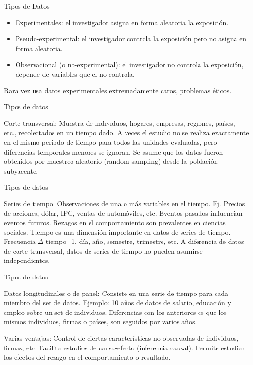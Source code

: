 \documentclass{beamer}
\begin{document}
    \begin{frame}{Tipos de Datos }
      

\begin{itemize}
    \item {\color{blue}Experimentales}: el investigador asigna en forma aleatoria la exposici\'on.
    \item {\color{blue} Pseudo-experimental}: el investigador controla la exposici\'on pero no
asigna en forma aleatoria.
\item {\color{blue}Observacional (o no-experimental)}: el investigador no controla la exposici\'on, depende de variables que el no controla.
\end{itemize}

{\color{blue} Rara vez usa datos experimentales
extremadamente caros, problemas éticos.}
    \end{frame}

    \begin{frame}{Tipos de datos}

   {\color{blue}Corte transversal: }Muestra de individuos, hogares, empresas, regiones, países, etc., recolectados en un tiempo dado.
A veces el estudio no se realiza exactamente en el mismo periodo de tiempo para todos las unidades evaluadas, pero diferencias temporales menores se ignoran.
Se asume que los datos fueron obtenidos por muestreo aleatorio (random sampling) desde la población subyacente.

        
    \end{frame}


\begin{frame}{Tipos de datos}

{\color{blue}Series de tiempo: }Observaciones de una o más variables en el tiempo.
Ej. Precios de acciones, dólar, IPC, ventas de automóviles, etc.
Eventos pasados influencian eventos futuros.
Rezagos en el comportamiento son prevalentes en ciencias sociales.
Tiempo es una dimensión importante en datos de series de tiempo.
Frecuencia $\Delta$ tiempo=1, día, año, semestre, trimestre, etc. 
A diferencia de datos de corte transversal, datos de series de tiempo no pueden asumirse independientes.

\end{frame}

\begin{frame}{Tipos de datos}

{\color{blue}Datos longitudinales o de panel: }Consiste en una serie de tiempo para cada miembro del set de datos.
Ejemplo: 10 años de datos de salario, educación y empleo sobre un set de individuos.
Diferencias con los anteriores es que los mismos individuos, firmas o países, son seguidos por varios años.

Varias ventajas:
Control de ciertas características no observadas de individuos, firmas, etc.
Facilita estudios de causa-efecto (inferencia causal).
Permite estudiar los efectos del rezago en el comportamiento o resultado.

\end{frame}
\end{document}
